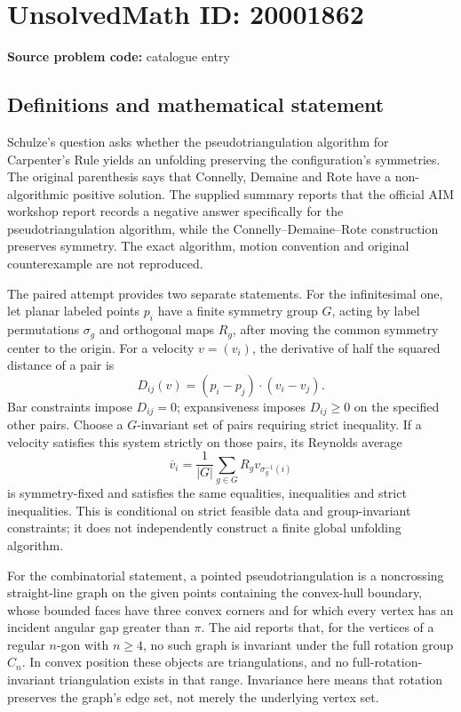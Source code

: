\documentclass[11pt]{article}
\begin{document}
\section*{UnsolvedMath ID: 20001862}
\textbf{Source problem code:} catalogue entry
\subsection{Definitions and mathematical statement}
Schulze's question asks whether the pseudotriangulation algorithm for Carpenter's Rule yields an unfolding preserving the configuration's symmetries. The original parenthesis says that Connelly, Demaine and Rote have a non-algorithmic positive solution. The supplied summary reports that the official AIM workshop report records a negative answer specifically for the pseudotriangulation algorithm, while the Connelly--Demaine--Rote construction preserves symmetry. The exact algorithm, motion convention and original counterexample are not reproduced.

The paired attempt provides two separate statements. For the infinitesimal one, let planar labeled points \(p_i\) have a finite symmetry group \(G\), acting by label permutations \(\sigma_g\) and orthogonal maps \(R_g\), after moving the common symmetry center to the origin. For a velocity \(v=(v_i)\), the derivative of half the squared distance of a pair is
\[
 D_{ij}(v)=(p_i-p_j)\cdot(v_i-v_j).
\]
Bar constraints impose \(D_{ij}=0\); expansiveness imposes \(D_{ij}\geq0\) on the specified other pairs. Choose a \(G\)-invariant set of pairs requiring strict inequality. If a velocity satisfies this system strictly on those pairs, its Reynolds average
\[
 \overline v_i=\frac1{|G|}\sum_{g\in G}
 R_gv_{\sigma_g^{-1}(i)}
\]
is symmetry-fixed and satisfies the same equalities, inequalities and strict inequalities. This is conditional on strict feasible data and group-invariant constraints; it does not independently construct a finite global unfolding algorithm.

For the combinatorial statement, a pointed pseudotriangulation is a noncrossing straight-line graph on the given points containing the convex-hull boundary, whose bounded faces have three convex corners and for which every vertex has an incident angular gap greater than \(\pi\). The aid reports that, for the vertices of a regular \(n\)-gon with \(n\geq4\), no such graph is invariant under the full rotation group \(C_n\). In convex position these objects are triangulations, and no full-rotation-invariant triangulation exists in that range. Invariance here means that rotation preserves the graph's edge set, not merely the underlying vertex set.
\end{document}
